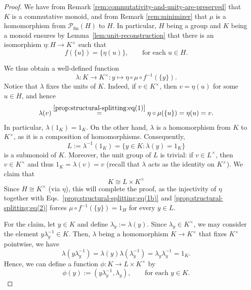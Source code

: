 \documentclass[10pt,a4paper]{amsart}
\newcommand{\fin}{\mathrm{fin}}
\begin{document}
\begin{proof}
We have from Remark \ref{rem:commutativity-and-unity-are-preserved} that $K$ is a commutative monoid, and from Remark \ref{rem:minimizer} that $\mu$ is a homomorphism from $\mathcal P_\fin(H)$ to $H$. In particular, $H$ being a group and $K$ being 
a monoid ensures by Lemma~\ref{lem:unit-reconstruction} that there is an isomorphism $\eta \colon H \to K^\times$ such that 
%
\begin{equation}
\label{prop:structural-splitting:eq(1)}
f(\{u\}) = \{\eta(u)\},
\qquad\text{for each }
u \in H.
\end{equation}

We thus obtain a well-defined function
\begin{equation}
\label{prop:structural-splitting:eq(1b)}
\lambda \colon K \to K^\times \colon y \mapsto \eta \circ \mu\circ f^{-1}(\{y\}).
\end{equation}
Notice that $\lambda$ fixes the units of $K$. Indeed, if $v \in K^\times$, then $v = \eta(u)$ for some $u \in H$, and hence
\[
\lambda(v) \stackrel{\eqref{prop:structural-splitting:eq(1)}}{=} \eta \circ \mu(\{u\}) = \eta(u) = v.
\]
In particular, $\lambda(1_K) = 1_K$. On the other hand, $\lambda$ is a 
homomorphism from $K$ to $K^\times$, as it is a composition of homomorphisms. 
Consequently, 
\begin{equation}
\label{prop:structural-splitting:eq(2)}
L := \lambda^{-1}(1_K) = \{y \in K: \lambda(y) = 1_K\}
\end{equation}
is a submonoid of $K$. Moreover, the unit group of $L$ is trivial: if $v \in L^\times$, then $v \in K^\times$ and thus $1_K = \lambda(v) = v$ (recall that $\lambda$ acts as the identity on $K^\times$). We claim that 
\[
K \cong L \times K^\times
\]
Since $H \cong \allowbreak K^\times$ (via $\eta$), this will complete the proof, as the injectivity of $\eta$ together with Eqs.~\eqref{prop:structural-splitting:eq(1b)} and \eqref{prop:structural-splitting:eq(2)} forces $\mu \circ f^{-1}(\{y\}) = 1_H$ for every $y \in L$.


For the claim, let $y \in K$ and define $\lambda_y := \lambda(y)$. Since $\lambda_y \in K^\times$, we may consider the element $y\lambda_y^{-1} \in K$. Then, $\lambda$ being a homomorphism $K \to K^\times$ that fixes $K^\times$ pointwise, we have
\[
\lambda(y \lambda_y^{-1}) = \lambda(y) \lambda(\lambda_y^{-1}) = \lambda_y \lambda_y^{-1} = 1_K.
\]
Hence, we can define a function $\phi \colon K \to L \times K^\times$ by 
\[
\phi(y) := (y \lambda_y^{-1}, \lambda_y),
\qquad \text{for each } y \in K.
\]


\end{proof}
\end{document}
